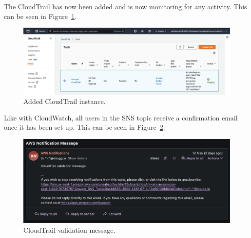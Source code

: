 \clearpage
The CloudTrail has now been added and is now monitoring for any activity.
This can be seen in Figure~\ref{fig:cloudtrail-added}.

\begin{figure}[!htbp]
    \centering
    \includegraphics[width=\textwidth]{resources/cloudtrail/cloudtrail-added}
    \caption{Added CloudTrail instance.}
    \label{fig:cloudtrail-added}
\end{figure}

Like with CloudWatch, all users in the SNS topic receive a confirmation email once it has been set up.
This can be seen in Figure~\ref{fig:cloudtrail-validation-message}.

\begin{figure}[!htbp]
    \centering
    \includegraphics[width=\textwidth]{resources/cloudtrail/cloudtrail-validation-message}
    \caption{CloudTrail validation message.}
    \label{fig:cloudtrail-validation-message}
\end{figure}
